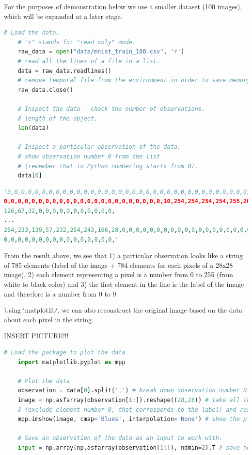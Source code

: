 For the purposes of demonstration below we use a smaller dataset (100 images), which will be expanded at a later stage.


\begin{lstlisting}[language=Python]
    # Load the data.
    # "r" stands for "read only" mode.
    raw_data = open("data/mnist_train_100.csv", 'r') 
    # read all the lines of a file in a list.
    data = raw_data.readlines() 
    # remove temporal file from the environment in order to save memory.
    raw_data.close() 

    # Inspect the data - check the number of observations.
    # length of the object.
    len(data) 

    # Inspect a particular observation of the data.
    # show observation number 0 from the list
    # (remember that in Python numbering starts from 0).
    data[0]
\end{lstlisting}

\begin{lstlisting}[language=Python]
'3,0,0,0,0,0,0,0,0,0,0,0,0,0,0,0,0,0,0,0,0,0,0,0,0,0,0,0,0,0,0,0,0,0,0,
0,0,0,0,0,0,0,0,0,0,0,0,0,0,0,0,0,0,0,0,0,0,0,10,254,254,254,254,255,209,
126,67,32,0,0,0,0,0,0,0,0,0,0,0,
...
254,233,139,57,232,254,243,166,28,0,0,0,0,0,0,0,0,0,0,0,0,0,0,0,0,0,0,0,0,
0,0,0,0,0,0,0,0,0,0,0,0,0,0,0,0,'
\end{lstlisting}

From the result above, we see that 1) a particular observation looks like a string of 785 elements (label of the image + 784 elements for each pixels of a 28x28 image), 2) each element representing a pixel is a number from 0 to 255 (from white to black color) and 3) the first element in the line is the label of the image and therefore is a number from 0 to 9.

Using `matplotlib`, we can also reconstruct the original image based on the data about each pixel in the string.

INSERT PICTURE!!!

\begin{lstlisting}[language=Python]
    # Load the package to plot the data
    import matplotlib.pyplot as mpp

    # Plot the data
    observation = data[0].split(',') # break down observation number 0 (comma is used to identify each element).
    image = np.asfarray(observation[1:]).reshape((28,28)) # take all the elements starting from the element 1 
    # (exclude element number 0, that corresponds to the label) and reshape them as an array with dimension 28 by 28.
    mpp.imshow(image, cmap='Blues', interpolation='None') # show the plot of this array using blue pallete.

    # Save an observation of the data as an input to work with.
    input = np.array(np.asfarray(observation[1:]), ndmin=2).T # save necessary elements in a vertical vector shape.
\end{lstlisting}


